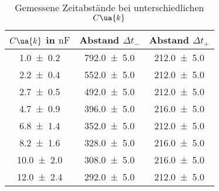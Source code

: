 \begin{table} 
\centering 
\caption{Gemessene Zeitabstände bei unterschiedlichen $C\ua{k}$} 
\label{fig:teilc_gemessene_zeit} 
\begin{tabular}{S S S } 
\toprule  
{$C\ua{k}$ in $\si{\nano\farad}$} & {Abstand $\Delta t_-$} & {Abstand $\Delta t_+$}  \\ 
\midrule  
 \num{1.0\pm0.2} & \num{792.0\pm5.0} & \num{212.0\pm5.0}\\ 
\num{2.2\pm0.4} & \num{552.0\pm5.0} & \num{212.0\pm5.0}\\ 
\num{2.7\pm0.5} & \num{492.0\pm5.0} & \num{212.0\pm5.0}\\ 
\num{4.7\pm0.9} & \num{396.0\pm5.0} & \num{216.0\pm5.0}\\ 
\num{6.8\pm1.4} & \num{352.0\pm5.0} & \num{212.0\pm5.0}\\ 
\num{8.2\pm1.6} & \num{328.0\pm5.0} & \num{216.0\pm5.0}\\ 
\num{10.0\pm2.0} & \num{308.0\pm5.0} & \num{216.0\pm5.0}\\ 
\num{12.0\pm2.4} & \num{292.0\pm5.0} & \num{212.0\pm5.0}\\ 
\bottomrule 
\end{tabular} 
\end{table}
